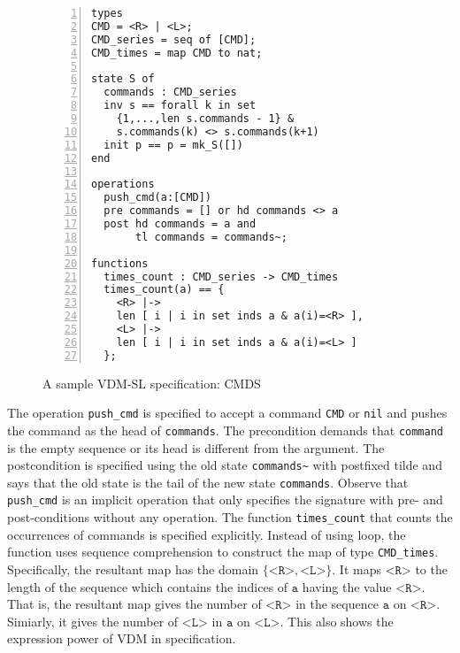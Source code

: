 \begin{figure}[t]
\begin{center}
\begin{mdframed}[roundcorner=5pt]
\begin{Verbatim}[fontsize=\small,numbers=left]
types
CMD = <R> | <L>;
CMD_series = seq of [CMD];
CMD_times = map CMD to nat;

state S of
  commands : CMD_series
  inv s == forall k in set 
    {1,...,len s.commands - 1} &
    s.commands(k) <> s.commands(k+1)
  init p == p = mk_S([])
end

operations
  push_cmd(a:[CMD])
  pre commands = [] or hd commands <> a
  post hd commands = a and
       tl commands = commands~;

functions
  times_count : CMD_series -> CMD_times
  times_count(a) == {
    <R> |->
    len [ i | i in set inds a & a(i)=<R> ],
    <L> |->
    len [ i | i in set inds a & a(i)=<L> ]
  };
\end{Verbatim}
\end{mdframed}
\vspace{-10pt}
\caption{A sample VDM-SL specification: CMDS}
\label{fig:module_sample}
\end{center}
\end{figure}

The operation {\tt push\_cmd} is specified to accept a command {\tt CMD} or {\tt nil} and pushes the command as the head of {\tt commands}. The precondition demands that \texttt{command} is the empty sequence or its head is different from the argument. The postcondition is specified using the old state {\tt commands\textasciitilde} with postfixed tilde and says that the old state is the tail of the new state {\tt commands}. Observe that {\tt push\_cmd} is an implicit operation that only specifies the signature with pre- and post-conditions without any operation. The function \texttt{times\_count} that counts the occurrences of commands is specified explicitly. Instead of using loop, the function uses sequence comprehension to construct the map of type {\tt CMD\_times}. Specifically, the resultant map has the domain $\{ \texttt{<R>}, \texttt{<L>} \}$. It maps $\texttt{<R>}$ to the length of the sequence which contains the indices of $\texttt{a}$ having the value $\texttt{<R>}$. That is, the resultant map gives the number of $\texttt{<R>}$ in the sequence $\texttt{a}$ on $\texttt{<R>}$. Simiarly, it gives the number of $\texttt{<L>}$ in $\texttt{a}$ on $\texttt{<L>}$. This also shows the expression power of VDM in specification. 

